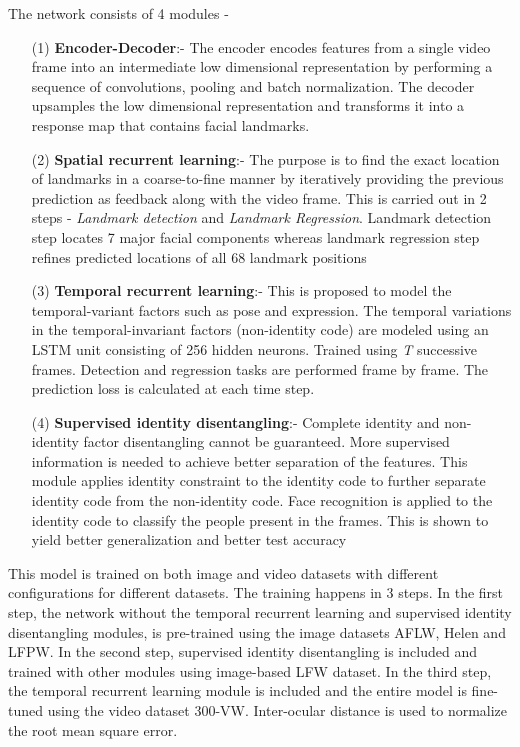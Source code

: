 \documentclass{llncs}
\begin{document}
The network consists of 4 modules -
\begin{itemize}
\item[(1)] \textbf{Encoder-Decoder}:-
The encoder encodes features from a single video frame into an intermediate low dimensional representation by performing a sequence of convolutions, pooling and batch normalization. The decoder upsamples the low dimensional representation and transforms it into a response map that contains facial landmarks.\\


\item[(2)] \textbf{Spatial recurrent learning}:-
The purpose is to find the exact location of landmarks in a coarse-to-fine manner by iteratively providing the previous prediction as feedback along with the video frame. This is carried out in 2 steps - \textit{Landmark detection} and \textit{Landmark Regression}. Landmark detection step locates 7 major facial components whereas landmark regression step refines predicted locations of all 68 landmark positions\\

\item[(3)] \textbf{Temporal recurrent learning}:-
This is proposed to model the temporal-variant factors such as pose and expression. The temporal variations in the temporal-invariant factors (non-identity code) are modeled using an LSTM unit consisting of 256 hidden neurons.
Trained using \textit{T} successive frames. Detection and regression tasks are performed frame by frame. The prediction loss is calculated at each time step. 
\\

\item[(4)] \textbf{Supervised identity disentangling}:-
Complete identity and non-identity factor disentangling cannot be guaranteed. More supervised information is needed to achieve better separation of the features. This module applies identity constraint to the identity code to further separate identity code from the non-identity code. Face recognition is applied to the identity code to classify the people present in the frames. This is shown to yield better generalization and better test accuracy\\
\end{itemize}

This model is trained on both image and video datasets with different configurations for different datasets. The training happens in 3 steps. In the first step, the network without the temporal recurrent learning and supervised identity disentangling modules, is pre-trained using the image datasets AFLW, Helen and LFPW. In the second step, supervised identity disentangling is included and trained with other modules using image-based LFW dataset. In the third step, the temporal recurrent learning module is included and the entire model is fine-tuned using the video dataset 300-VW. Inter-ocular distance is used to normalize the root mean square error. 
\end{document}
